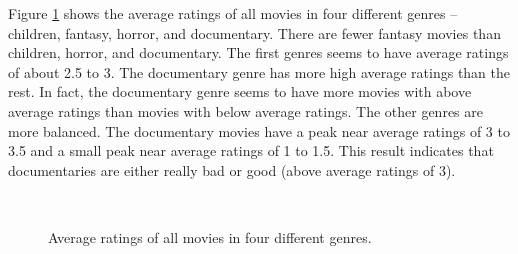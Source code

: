 Figure \ref{fig:average-3-genres} shows the average ratings of all movies in four different genres -- children, fantasy, horror, and documentary. There are fewer fantasy movies than children, horror, and documentary. The first genres seems to have average ratings of about 2.5 to 3. The documentary genre has more high average ratings than the rest. In fact, the documentary genre seems to have more movies with above average ratings than movies with below average ratings. The other genres are more balanced. The documentary movies have a peak near average ratings of 3 to 3.5 and a small peak near average ratings of 1 to 1.5. This result indicates that documentaries are either really bad or good (above average ratings of 3).


\begin{figure}[H]
	\centering
	\\
	\caption{Average ratings of all movies in four different genres.} \label{fig:average-3-genres}
\end{figure}
